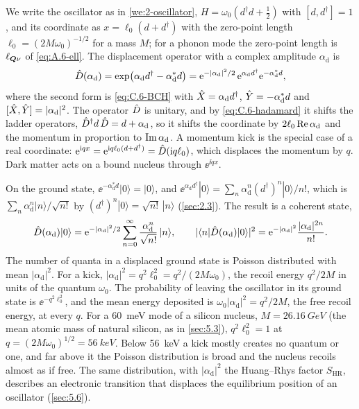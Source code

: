 We write the oscillator as in \cref{we:2-oscillator}, $H = \omega_0(d^\dagger d + \tfrac12)$ with $[d, d^\dagger] = 1$, and its coordinate as $x = \ell_0(d + d^\dagger)$ with the zero-point length $\ell_0 = (2M\omega_0)^{-1/2}$ for a mass $M$; for a phonon mode the zero-point length is $\ell_{\bm{Q}\nu}$ of \cref{eq:A.6-ell}. The displacement operator with a complex amplitude $\alpha_{\mathrm{d}}$ is
\begin{equation}
  \hat{D}(\alpha_{\mathrm{d}}) = \exp\bigl(\alpha_{\mathrm{d}}d^\dagger - \alpha_{\mathrm{d}}^*d\bigr) = \mathrm{e}^{-|\alpha_{\mathrm{d}}|^2/2}\,\mathrm{e}^{\alpha_{\mathrm{d}}d^\dagger}\mathrm{e}^{-\alpha_{\mathrm{d}}^*d} ,
  \label{eq:C.6-D}
\end{equation}
where the second form is \cref{eq:C.6-BCH} with $\hat{X} = \alpha_{\mathrm{d}}d^\dagger$, $\hat{Y} = -\alpha_{\mathrm{d}}^*d$ and $[\hat{X}, \hat{Y}] = |\alpha_{\mathrm{d}}|^2$. The operator $\hat{D}$ is unitary, and by \cref{eq:C.6-hadamard} it shifts the ladder operators, $\hat{D}^\dagger d\,\hat{D} = d + \alpha_{\mathrm{d}}$, so it shifts the coordinate by $2\ell_0\operatorname{Re}\alpha_{\mathrm{d}}$ and the momentum in proportion to $\operatorname{Im}\alpha_{\mathrm{d}}$. A momentum kick is the special case of a real coordinate: $\mathrm{e}^{\mathrm{i} qx} = \mathrm{e}^{\mathrm{i} q\ell_0(d + d^\dagger)} = \hat{D}(\mathrm{i} q\ell_0)$, which displaces the momentum by $q$. Dark matter acts on a bound nucleus through $\ee^{\ii qx}$.

On the ground state, $\ee^{-\alpha_{\mathrm{d}}^*d}|0\rangle = |0\rangle$, and $\ee^{\alpha_{\mathrm{d}}d^\dagger}|0\rangle = \sum_n\alpha_{\mathrm{d}}^n(d^\dagger)^n|0\rangle/n!$, which is $\sum_n\alpha_{\mathrm{d}}^n|n\rangle/\sqrt{n!}$ by $(d^\dagger)^n|0\rangle = \sqrt{n!}\,|n\rangle$ (\cref{sec:2.3}). The result is a coherent state,
\begin{equation}
  \hat{D}(\alpha_{\mathrm{d}})|0\rangle = \mathrm{e}^{-|\alpha_{\mathrm{d}}|^2/2}\sum_{n=0}^{\infty}\frac{\alpha_{\mathrm{d}}^n}{\sqrt{n!}}\,|n\rangle, \qquad
  |\langle n|\hat{D}(\alpha_{\mathrm{d}})|0\rangle|^2 = \mathrm{e}^{-|\alpha_{\mathrm{d}}|^2}\frac{|\alpha_{\mathrm{d}}|^{2n}}{n!} .
  \label{eq:C.6-coherent}
\end{equation}
The number of quanta in a displaced ground state is Poisson distributed with mean $|\alpha_{\mathrm{d}}|^2$. For a kick, $|\alpha_{\mathrm{d}}|^2 = q^2\ell_0^2 = q^2/(2M\omega_0)$, the recoil energy $q^2/2M$ in units of the quantum $\omega_0$. The probability of leaving the oscillator in its ground state is $\ee^{-q^2\ell_0^2}$, and the mean energy deposited is $\omega_0|\alpha_{\mathrm{d}}|^2 = q^2/2M$, the free recoil energy, at every $q$. For a \SI{60}{meV} mode of a silicon nucleus, $M = \SI{26.16}{GeV}$ (the mean atomic mass of natural silicon, as in \cref{sec:5.3}), $q^2\ell_0^2 = 1$ at $q = (2M\omega_0)^{1/2} = \SI{56}{keV}$. Below \SI{56}{keV} a kick mostly creates no quantum or one, and far above it the Poisson distribution is broad and the nucleus recoils almost as if free. The same distribution, with $|\alpha_{\mathrm{d}}|^2$ the Huang--Rhys factor $S_{\mathrm{HR}}$, describes an electronic transition that displaces the equilibrium position of an oscillator (\cref{sec:5.6}).

